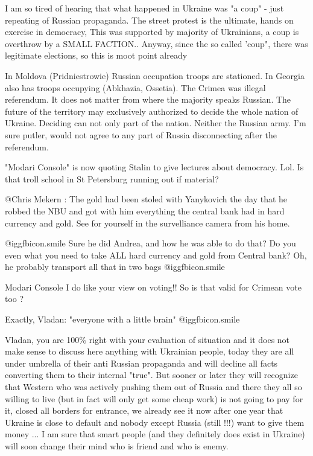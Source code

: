 \begin{itemize}
\begin{itemize}

I am so tired of hearing that what happened in Ukraine was "a coup" - just
repeating of Russian propaganda. The street protest is the ultimate, hands on
exercise in democracy, This was supported by majority of Ukrainians, a coup is
overthrow by a SMALL FACTION.. Anyway, since the so called 'coup", there was
legitimate elections, so this is moot point already


In Moldova (Pridniestrowie) Russian occupation troops are stationed. In Georgia
also has troops occupying (Abkhazia, Ossetia). The Crimea was illegal
referendum. It does not matter from where the majority speaks Russian. The
future of the territory may exclusively authorized to decide the whole nation
of Ukraine. Deciding can not only part of the nation. Neither the Russian army.
I'm sure putler, would not agree to any part of Russia disconnecting after the
referendum.



"Modari Console" is now quoting Stalin to give lectures about democracy. Lol.
Is that troll school in St Petersburg running out if material?


@Chris Mekern : The gold had been stoled with Yanykovich the day that he robbed
the NBU and got with him everything the central bank had in hard currency and
gold. See for yourself in the survelliance camera from his home.


 @igg{fbicon.smile}  Sure he did Andrea, and how he was able to do that? Do you even what you
need to take ALL hard currency and gold from Central bank? Oh, he probably
transport all that in two bags  @igg{fbicon.smile} 

Modari Console I do like your view on voting!! So is that valid for Crimean vote too ?

Exactly, Vladan: "everyone with a little brain"  @igg{fbicon.smile} 


Vladan, you are 100\% right with your evaluation of situation and it does not
make sense to discuss here anything with Ukrainian people, today they are all
under umbrella of their anti Russian propaganda and will decline all facts
converting them to their internal "true". But sooner or later they will
recognize that Western who was actively pushing them out of Russia and there
they all so willing to live (but in fact will only get some cheap work) is not
going to pay for it, closed all borders for entrance, we already see it now
after one year that Ukraine is close to default and nobody except Russia (still
!!!) want to give them money ... I am sure that smart people (and they
definitely does exist in Ukraine) will soon change their mind who is friend and
who is enemy.


\end{itemize}
\end{itemize}
